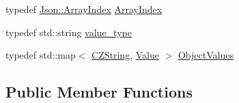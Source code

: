 \begin{DoxyCompactItemize}
\item 
typedef \hyperlink{namespaceJson_a8048e741f2177c3b5d9ede4a5b8c53c2_a8048e741f2177c3b5d9ede4a5b8c53c2}{Json\+::\+Array\+Index} \hyperlink{classJson_1_1Value_a184a91566cccca7b819240f0d5561c7d_a184a91566cccca7b819240f0d5561c7d}{Array\+Index}
\item 
typedef std\+::string \hyperlink{classJson_1_1Value_a9e071ef3c135a2c9602e893b6005d0f7_a9e071ef3c135a2c9602e893b6005d0f7}{value\+\_\+type}
\item 
typedef std\+::map$<$ \hyperlink{classJson_1_1Value_1_1CZString}{C\+Z\+String}, \hyperlink{classJson_1_1Value}{Value} $>$ \hyperlink{classJson_1_1Value_a08b6c80c3af7071d908dabf044de5388_a08b6c80c3af7071d908dabf044de5388}{Object\+Values}
\end{DoxyCompactItemize}
\subsection*{Public Member Functions}
